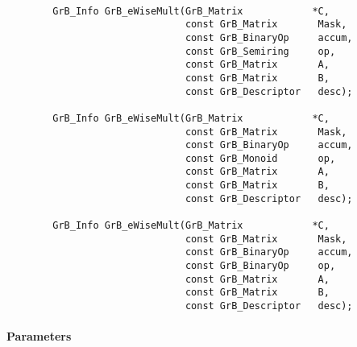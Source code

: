 \paragraph{\syntax}

\begin{verbatim}
        GrB_Info GrB_eWiseMult(GrB_Matrix            *C,
                               const GrB_Matrix       Mask,
                               const GrB_BinaryOp     accum,
                               const GrB_Semiring     op, 
                               const GrB_Matrix       A,
                               const GrB_Matrix       B,
                               const GrB_Descriptor   desc);
                            
        GrB_Info GrB_eWiseMult(GrB_Matrix            *C,
                               const GrB_Matrix       Mask,
                               const GrB_BinaryOp     accum,
                               const GrB_Monoid       op, 
                               const GrB_Matrix       A,
                               const GrB_Matrix       B,
                               const GrB_Descriptor   desc);
                            
        GrB_Info GrB_eWiseMult(GrB_Matrix            *C,
                               const GrB_Matrix       Mask,
                               const GrB_BinaryOp     accum,
                               const GrB_BinaryOp     op, 
                               const GrB_Matrix       A,
                               const GrB_Matrix       B,
                               const GrB_Descriptor   desc);
\end{verbatim}

\paragraph{Parameters}

